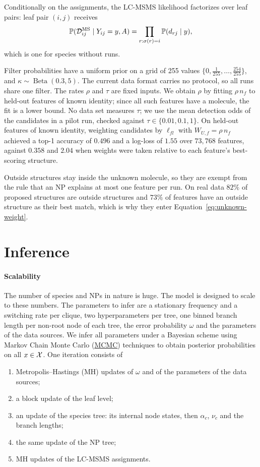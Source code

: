 \documentclass[
11pt, %
oneside, %
english, %
singlespacing, %
headsepline, %
chapterinoneline, %
]{MastersDoctoralThesis} %
\DeclareMathOperator{\BetaDist}{Beta}
\def\P{\mathbb{P}}
\def\X{{\cal X}}
\def\D{{\cal D}}
\begin{document}
Conditionally on the assignments, the LC-MSMS likelihood factorizes over leaf pairs: leaf pair $(i,j)$ receives
\begin{equation}
	\label{eq:ms-cell}
	\P(\D^{\mathrm{MS}}_{ij} \mid Y_{ij} = y, A) = \prod_{r : \sigma(r) = i} \P(d_{rj} \mid y),
\end{equation}
which is one for species without runs.

Filter probabilities have a uniform prior on a grid of 255 values $\{0, \tfrac{1}{255}, \ldots, \tfrac{254}{255}\}$, and $\kappa \sim \BetaDist(0.3, 5)$. The current data format carries no protocol, so all runs share one filter. The rates $\rho$ and $\tau$ are fixed inputs. We obtain $\rho$ by fitting $\rho\, n_f$ to held-out features of known identity; since all such features have a molecule, the fit is a lower bound. No data set measures $\tau$; we use the mean detection odds of the candidates in a pilot run, checked against $\tau \in \{0.01, 0.1, 1\}$. On held-out features of known identity, weighting candidates by $\ell_{fl}$ with $W_{U,f} = \rho\, n_f$ achieved a top-1 accuracy of $0.496$ and a log-loss of $1.55$ over $73{,}768$ features, against $0.358$ and $2.04$ when weights were taken relative to each feature's best-scoring structure.

Outside structures stay inside the unknown molecule, so they are exempt from the rule that an NP explains at most one feature per run. On real data $82\%$ of proposed structures are outside structures and $73\%$ of features have an outside structure as their best match, which is why they enter Equation~\eqref{eq:unknown-weight}.

\section{Inference}\label{sec:inference}

\paragraph{Scalability} The number of species and NPs in nature is huge. The model is designed to scale to these numbers. The parameters to infer are a stationary frequency and a switching rate per clique, two hyperparameters per tree, one binned branch length per non-root node of each tree, the error probability $\omega$ and the parameters of the data sources. We infer all parameters under a Bayesian scheme using Markov Chain Monte Carlo (\href{https://en.wikipedia.org/wiki/Markov_chain_Monte_Carlo}{MCMC}) techniques to obtain posterior probabilities on all $x \in \X$. One iteration consists of
\begin{enumerate}
	\item Metropolis--Hastings (MH) updates of $\omega$ and of the parameters of the data sources;
	\item a block update of the leaf level;
	\item an update of the species tree: its internal node states, then $\alpha_c$, $\nu_c$ and the branch lengths;
	\item the same update of the NP tree;
	\item MH updates of the LC-MSMS assignments.
\end{enumerate}
\end{document}

